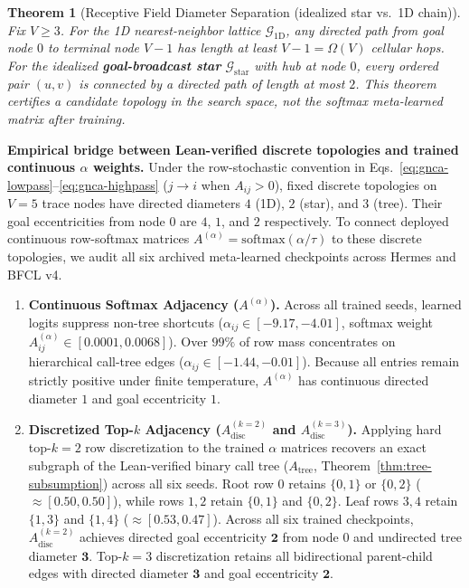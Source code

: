 \documentclass[10pt,twocolumn,letterpaper]{article}
\newtheorem{theorem}{Theorem}
\begin{document}
\begin{theorem}[Receptive Field Diameter Separation (idealized star vs.\ 1D chain)]\label{thm:diameter}
Fix $V \ge 3$. For the 1D nearest-neighbor lattice $\mathcal{G}_{\mathrm{1D}}$, any directed path from goal node $0$ to terminal node $V{-}1$ has length at least $V{-}1 = \Omega(V)$ cellular hops. For the idealized \textbf{goal-broadcast star} $\mathcal{G}_{\mathrm{star}}$ with hub at node $0$, every ordered pair $(u,v)$ is connected by a directed path of length at most $2$. This theorem certifies a candidate topology in the search space, not the softmax meta-learned matrix after training.
\end{theorem}

\noindent\textbf{Empirical bridge between Lean-verified discrete topologies and trained continuous $\alpha$ weights.} Under the row-stochastic convention in Eqs.~\eqref{eq:gnca-lowpass}--\eqref{eq:gnca-highpass} ($j \to i$ when $A_{ij}>0$), fixed discrete topologies on $V{=}5$ trace nodes have directed diameters $4$ (1D), $2$ (star), and $3$ (tree). Their goal eccentricities from node $0$ are $4$, $1$, and $2$ respectively. To connect deployed continuous row-softmax matrices $A^{(\alpha)} = \mathrm{softmax}(\alpha/\tau)$ to these discrete topologies, we audit all six archived meta-learned checkpoints across Hermes and BFCL v4.
\begin{enumerate}[leftmargin=1.5em, itemsep=0.05em]
  \item \textbf{Continuous Softmax Adjacency ($A^{(\alpha)}$).} Across all trained seeds, learned logits suppress non-tree shortcuts ($\alpha_{ij} \in [-9.17, -4.01]$, softmax weight $A_{ij}^{(\alpha)} \in [0.0001, 0.0068]$). Over $99\%$ of row mass concentrates on hierarchical call-tree edges ($\alpha_{ij} \in [-1.44, -0.01]$). Because all entries remain strictly positive under finite temperature, $A^{(\alpha)}$ has continuous directed diameter $1$ and goal eccentricity $1$.
  \item \textbf{Discretized Top-$k$ Adjacency ($A_{\text{disc}}^{(k=2)}$ and $A_{\text{disc}}^{(k=3)}$).} Applying hard top-$k=2$ row discretization to the trained $\alpha$ matrices recovers an exact subgraph of the Lean-verified binary call tree ($A_{\text{tree}}$, Theorem~\ref{thm:tree-subsumption}) across all six seeds. Root row $0$ retains $\{0, 1\}$ or $\{0, 2\}$ ($\approx [0.50, 0.50]$), while rows $1, 2$ retain $\{0, 1\}$ and $\{0, 2\}$. Leaf rows $3, 4$ retain $\{1, 3\}$ and $\{1, 4\}$ ($\approx [0.53, 0.47]$). Across all six trained checkpoints, $A_{\text{disc}}^{(k=2)}$ achieves directed goal eccentricity $\mathbf{2}$ from node $0$ and undirected tree diameter $\mathbf{3}$. Top-$k=3$ discretization retains all bidirectional parent-child edges with directed diameter $\mathbf{3}$ and goal eccentricity $\mathbf{2}$.
\end{enumerate}
\end{document}
